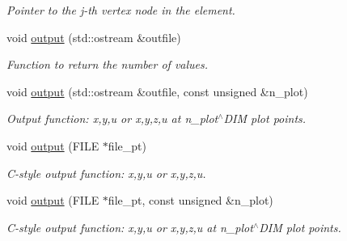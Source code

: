 \begin{DoxyCompactItemize}
\begin{DoxyCompactList}\small\item\em Pointer to the j-\/th vertex node in the element. \end{DoxyCompactList}\item 
void \hyperlink{classoomph_1_1SpectralPeriodicOrbitElement_ac2b85b567337f5126c4dea2e8c82ed17}{output} (std\+::ostream \&outfile)
\begin{DoxyCompactList}\small\item\em Function to return the number of values. \end{DoxyCompactList}\item 
void \hyperlink{classoomph_1_1SpectralPeriodicOrbitElement_ab4c88a199b195d8e06630c4750ce06cf}{output} (std\+::ostream \&outfile, const unsigned \&n\+\_\+plot)
\begin{DoxyCompactList}\small\item\em Output function\+: x,y,u or x,y,z,u at n\+\_\+plot$^\wedge$\+D\+IM plot points. \end{DoxyCompactList}\item 
void \hyperlink{classoomph_1_1SpectralPeriodicOrbitElement_a2a16805778b8497d7b394f3cbd010fc0}{output} (F\+I\+LE $\ast$file\+\_\+pt)
\begin{DoxyCompactList}\small\item\em C-\/style output function\+: x,y,u or x,y,z,u. \end{DoxyCompactList}\item 
void \hyperlink{classoomph_1_1SpectralPeriodicOrbitElement_ae8bcd7bd13389fe289242750880cd9bf}{output} (F\+I\+LE $\ast$file\+\_\+pt, const unsigned \&n\+\_\+plot)
\begin{DoxyCompactList}\small\item\em C-\/style output function\+: x,y,u or x,y,z,u at n\+\_\+plot$^\wedge$\+D\+IM plot points. \end{DoxyCompactList}\end{DoxyCompactItemize}
